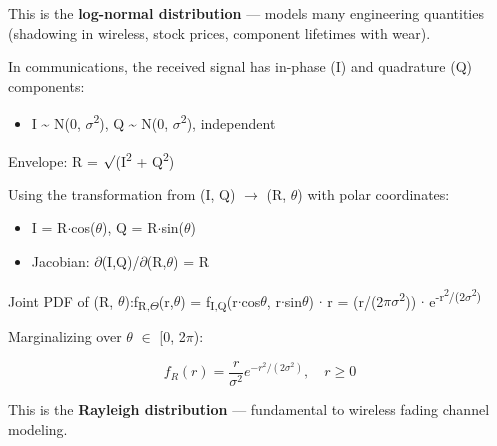 This is the \textbf{log-normal distribution} — models many engineering quantities (shadowing in wireless, stock prices, component lifetimes with wear).



In communications, the received signal has in-phase (I) and quadrature (Q) components:

\begin{itemize}
\tightlist
\item
  I \textasciitilde{} N(0, \ensuremath{\sigma}\textsuperscript{2}), Q \textasciitilde{} N(0, \ensuremath{\sigma}\textsuperscript{2}), independent
\end{itemize}

Envelope: R = \ensuremath{\surd}(I\textsuperscript{2} + Q\textsuperscript{2})

Using the transformation from (I, Q) \ensuremath{\to} (R, \ensuremath{\theta}) with polar coordinates:

\begin{itemize}
\tightlist
\item
  I = R\ensuremath{\cdot}cos(\ensuremath{\theta}), Q = R\ensuremath{\cdot}sin(\ensuremath{\theta})
\item
  Jacobian: \textbar{}\ensuremath{\partial}(I,Q)/\ensuremath{\partial}(R,\ensuremath{\theta})\textbar{} = R
\end{itemize}

Joint PDF of (R, \ensuremath{\theta}):\PSbr{}f\textsubscript{R,\ensuremath{\Theta}}(r,\ensuremath{\theta}) = f\textsubscript{I,Q}(r\ensuremath{\cdot}cos\ensuremath{\theta}, r\ensuremath{\cdot}sin\ensuremath{\theta}) \ensuremath{\cdot} r = (r/(2\ensuremath{\pi}\ensuremath{\sigma}\textsuperscript{2})) \ensuremath{\cdot} e\textsuperscript{-r\textsuperscript{2}/(2\ensuremath{\sigma}\textsuperscript{2})}

Marginalizing over \ensuremath{\theta} \ensuremath{\in} [0, 2\ensuremath{\pi}):

\[f_R(r) = \frac{r}{\sigma^2} e^{-r^2/(2\sigma^2)}, \quad r \geq 0\]

This is the \textbf{Rayleigh distribution} — fundamental to wireless fading channel modeling.


